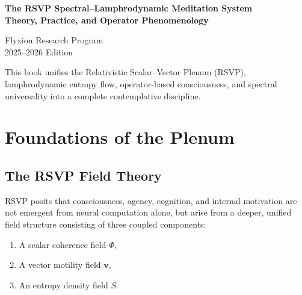 \documentclass[12pt]{article}
\begin{document}

\begin{titlepage}
\centering

{\Huge\bfseries The RSVP Spectral--Lamphrodynamic Meditation System\\[1.5ex]
\large Theory, Practice, and Operator Phenomenology\par}

\vspace{2cm}

{\Large Flyxion Research Program\\[1ex]
2025--2026 Edition}

\vfill

\begin{large}
This book unifies the Relativistic Scalar--Vector Plenum (RSVP),  
lamphrodynamic entropy flow, operator-based consciousness,  
and spectral universality into a complete contemplative discipline.
\end{large}

\vfill

\end{titlepage}

\frontmatter

\tableofcontents

\mainmatter


\part{Foundations of the Plenum}

\chapter{The RSVP Field Theory}

RSVP posits that consciousness, agency, cognition, and internal motivation are
not emergent from neural computation alone, but arise from a deeper, unified
field structure consisting of three coupled components:

\begin{enumerate}
\item A scalar coherence field $\Phi$,
\item A vector motility field $\mathbf{v}$,
\item An entropy density field $S$.
\end{enumerate}
\end{document}
